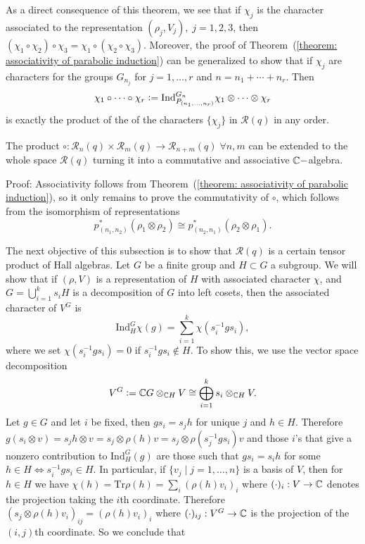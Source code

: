 As a direct consequence of this theorem, we see that if $\chi_j$ is the character associated to the representation $(\rho_j,V_j),\;j=1,2,3$, then $(\chi_1\circ\chi_2)\circ\chi_3 = \chi_1\circ(\chi_2\circ\chi_3)$. Moreover, the proof of Theorem~(\ref{theorem: associativity of parabolic induction}) can be generalized to show that if $\chi_j$ are characters for the groups $G_{n_j}$ for $j=1,\dots,r$ and $n=n_1+\cdots+n_r$. Then 
\begin{equation}\label{equation: general product of characters}
\chi_1\circ\cdots\circ\chi_r\bydef\text{Ind}_{P_{(n_1,\dots,n_r)}}^{G_n}\chi_1\otimes\cdots\otimes \chi_r
\end{equation}
is exactly the product of the of the characters $\{\chi_j\}$ in $\mathcal{R}(q)$ in any order.
\begin{dang}
    \begin{theorem}\cite{jing2024characters}
        The product $\circ:\mathcal{R}_{n}(q)\times\mathcal{R}_{m}(q)\rightarrow \mathcal{R}_{n+m}(q)\;\forall n,m$ can be extended to the whole space $\mathcal{R}(q)$ turning it into a commutative and associative $\mathbb{C}-$algebra.
    \end{theorem}
\end{dang}
Proof: Associativity follows from Theorem~(\ref{theorem: associativity of parabolic induction}), so it only remains to prove the commutativity of $\circ$, which follows from the isomorphism of representations
\begin{equation}
    p_{(n_1,n_2)}^*(\rho_1\otimes\rho_2)\cong p_{(n_2,n_1)}^*(\rho_2\otimes\rho_1).
\end{equation}
\par
The next objective of this subsection is to show that $\mathcal{R}(q)$ is a certain tensor product of Hall algebras. Let $G$ be a finite group and $H\subset G$ a subgroup. We will show that if $(\rho, V)$ is a representation of $H$ with associated character $\chi$, and $G=\bigcup_{i=1}^ks_iH$ is a decomposition of $G$ into left cosets, then the associated character of $V^G$ is
\begin{equation}
    \text{Ind}_H^G\chi(g) = \sum_{i=1}^k\chi(s_i^{-1}gs_i),
\end{equation}
where we set $\chi(s_{i}^{-1}gs_i)=0$ if $s_{i}^{-1}gs_i\notin H$. To show this, we use the vector space decomposition
\begin{equation}
    V^G\bydef \bb{C}G\otimes_{\bb{C}H}V\cong \bigoplus_{i=1}^ks_i\otimes_{\bb{C}H}V.
\end{equation}
Let $g\in G$ and let $i$ be fixed, then $gs_i=s_jh$ for unique $j$ and $h\in H$. Therefore $g(s_i\otimes v)=s_jh\otimes v = s_j\otimes \rho(h)v=s_j\otimes\rho(s_j^{-1}gs_i)v$ and those $i$'s that give a nonzero contribution to $\text{Ind}_H^G(g)$ are those such that $gs_i=s_ih$ for some $h\in H\iff s_i^{-1}gs_i\in H$. In particular, if $\{v_j\mid j=1,\dots, n\}$ is a basis of $V$, then for $h\in H$ we have $\chi(h)=\text{Tr}\rho(h) = \sum_i(\rho(h)v_i)_i$ where $(\cdot)_i:V\rightarrow\mathbb{C}$ denotes the projection taking the $i$th coordinate. Therefore $(s_j\otimes \rho(h)v_i)_{ij}=(\rho(h)v_i)_i$ where $(\cdot)_{ij}:V^G\rightarrow\mathbb{C}$ is the projection of the $(i,j)$th coordinate. So we conclude that
